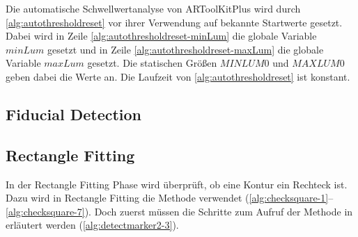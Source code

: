 Die automatische Schwellwertanalyse von ARToolKitPlus wird durch \autoref{alg:autothresholdreset} vor ihrer Verwendung
 auf bekannte Startwerte gesetzt. Dabei wird in Zeile \ref{alg:autothresholdreset-minLum} die globale Variable
 $\mathit{minLum}$ gesetzt und in Zeile \ref{alg:autothresholdreset-maxLum} die globale Variable $\mathit{maxLum}$
 gesetzt. Die statischen Größen $\mathit{MINLUM0}$ und $\mathit{MAXLUM0}$ geben dabei die Werte an. Die Laufzeit von
 \autoref{alg:autothresholdreset} ist konstant.







\subsection{Fiducial Detection} %
\label{sec:fiducial_detection}


\clearpage

\subsection{Rectangle Fitting} %
\label{sec:rectangle_fitting}

In der Rectangle Fitting Phase wird überprüft, ob eine Kontur ein Rechteck ist. Dazu wird in Rectangle Fitting die
 Methode  verwendet (\autoref{alg:checksquare-1}--\autoref{alg:checksquare-7}). Doch zuerst
 müssen die Schritte zum Aufruf der Methode in  erläutert werden
 (\autoref{alg:detectmarker2-3}).



